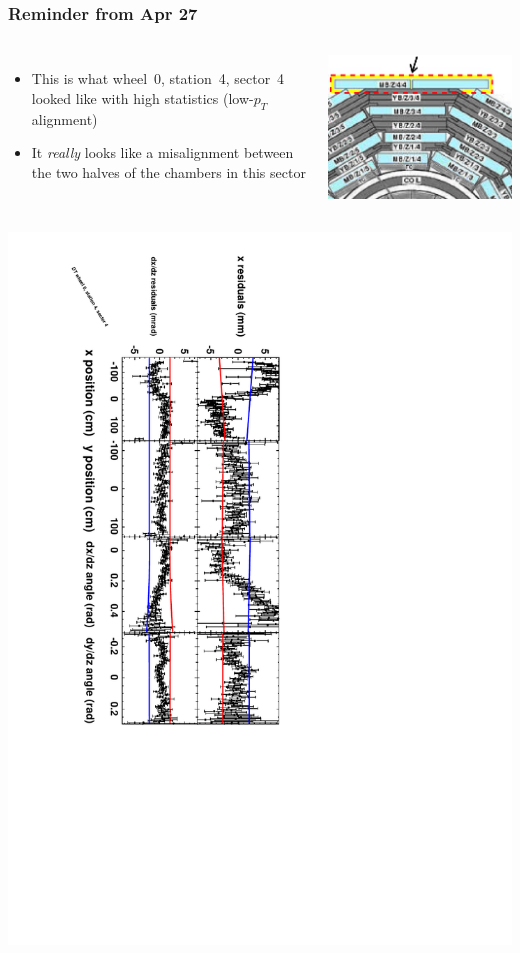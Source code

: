 \documentclass[compress]{beamer}
\begin{document}
\begin{frame}
\frametitle{Reminder from Apr 27}

\begin{columns}
\begin{itemize}
\item This is what wheel~0, station~4, sector~4 looked like with high statistics (low-$p_T$ alignment)
\item It {\it really} looks like a misalignment between the two halves of the chambers in this sector
\end{itemize}

\includegraphics[width=\linewidth]{station4_sector4.png}
\end{columns}

\vspace{0.5 cm}
\includegraphics[height=\linewidth, angle=90]{datafit_st4sec_04_13.pdf}

\vspace{-1 cm}
\end{frame}
\end{document}
